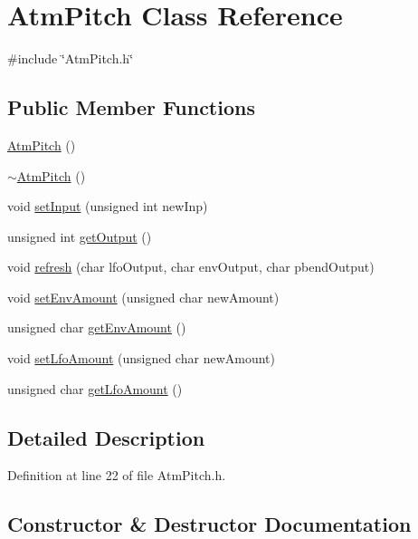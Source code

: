 \hypertarget{class_atm_pitch}{}\section{Atm\+Pitch Class Reference}
\label{class_atm_pitch}


{\ttfamily \#include \char`\"{}Atm\+Pitch.\+h\char`\"{}}

\subsection*{Public Member Functions}
\begin{DoxyCompactItemize}
\item 
\hyperlink{class_atm_pitch_a02c102d3f93af7a44230dad9c23f4023}{Atm\+Pitch} ()
\item 
\hyperlink{class_atm_pitch_aaefa1f3952ff8c8c6b8cf0ed99cc1fa7}{$\sim$\+Atm\+Pitch} ()
\item 
void \hyperlink{class_atm_pitch_a5e7f1f2581cc25bb966fdfe0c945923d}{set\+Input} (unsigned int new\+Inp)
\item 
unsigned int \hyperlink{class_atm_pitch_a30b8bb597d3f1ce75a0394d2dd510004}{get\+Output} ()
\item 
void \hyperlink{class_atm_pitch_a2fc4d9ea4f73818022f9512a656b9572}{refresh} (char lfo\+Output, char env\+Output, char pbend\+Output)
\item 
void \hyperlink{class_atm_pitch_a6e1cbd180ffd94db37eceb4fe95b039b}{set\+Env\+Amount} (unsigned char new\+Amount)
\item 
unsigned char \hyperlink{class_atm_pitch_a850e1e507b70bc3a12049d48cd65283f}{get\+Env\+Amount} ()
\item 
void \hyperlink{class_atm_pitch_a4d4617a54ac352f240b72f3b2194b6c7}{set\+Lfo\+Amount} (unsigned char new\+Amount)
\item 
unsigned char \hyperlink{class_atm_pitch_ace9d80c3de42d8e0920e6d23cf753dcc}{get\+Lfo\+Amount} ()
\end{DoxyCompactItemize}


\subsection{Detailed Description}


Definition at line 22 of file Atm\+Pitch.\+h.



\subsection{Constructor \& Destructor Documentation}
\mbox{\label{class_atm_pitch_a02c102d3f93af7a44230dad9c23f4023}} 
